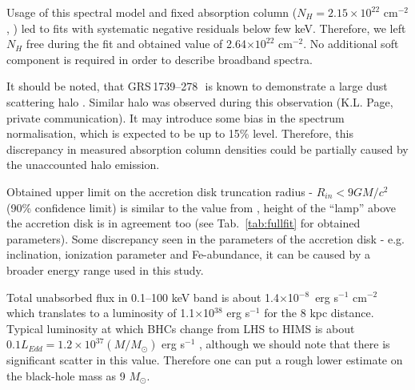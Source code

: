 \documentclass[a4paper,fleqn,usenatbib]{mnras}
\def\grs{{GRS\,1739--278\,}}
\begin{document}
Usage of this spectral model and fixed absorption column ($N_{H} = 2.15\times10^{22}$ cm$^{-2}$, \citep{fuerst16_gx339}) led to fits with systematic negative residuals below few keV. 
Therefore, we left $N_{H}$ free during the fit and obtained value of 2.64$\times10^{22}$ cm$^{-2}$. 
No additional soft component is required in order to describe broadband spectra.

It should be noted, that \grs\, is known to demonstrate a large dust scattering halo \citep{greiner96}. 
Similar halo was observed during this observation (K.L. Page, private communication). 
It may introduce some bias in the spectrum normalisation, which is expected to be up to 15\% level. 
Therefore, this discrepancy in measured absorption column densities could be partially caused by the unaccounted halo emission.

Obtained upper limit on the accretion disk truncation radius - $R_{in} < 9 GM/c^{2}$ (90\% confidence limit) is similar to the value from \cite{miller15_nust}, height of the ``lamp'' above the accretion disk is in agreement too (see Tab.~\ref{tab:fullfit} for obtained parameters). 
Some discrepancy seen in the parameters of the accretion disk - e.g. inclination, ionization parameter and Fe-abundance, it can be caused by a broader energy range used in this study. 

Total unabsorbed flux in 0.1--100 keV band is about 1.4$\times$10$^{-8}$~erg s$^{-1}$ cm$^{-2}$ which translates to a luminosity of 1.1$\times$10$^{38}$ erg s$^{-1}$ for the 8 kpc distance. 
Typical luminosity at which BHCs change from LHS to HIMS is about $0.1 L_{Edd} = 1.2\times10^{37} (M/M_{\odot})$ erg s$^{-1}$ \citep{2010MNRAS.403...61D}, although we should note that there is significant scatter in this value. 
Therefore one can put a rough lower estimate on the black-hole mass as 9 $M_{\odot}$.
\end{document}

